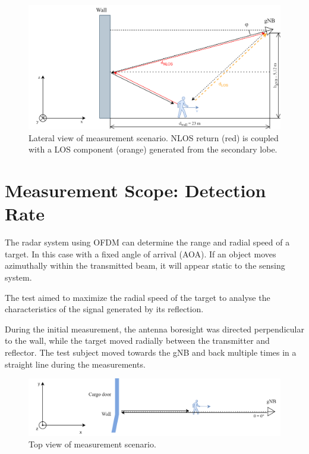 \begin{figure}[H]
	\centering
	\includegraphics[width=1\textwidth]{Images/Test1/base-lateral_view_los_geometry}
	\caption{Lateral view of measurement scenario. NLOS return (red) is coupled with a LOS component (orange) generated from the secondary lobe.}
	\label{fig:Test1_base-lateral_view}
\end{figure}

\section{Measurement Scope: Detection Rate}

The radar system using OFDM can determine the range and radial speed of a target. In this case with a fixed angle of arrival (AOA). If an object moves azimuthally within the transmitted beam, it will appear static to the sensing system.

The test aimed to maximize the radial speed of the target to analyse the characteristics of the signal generated by its reflection.

During the initial measurement, the antenna boresight was directed perpendicular to the wall, while the target moved radially between the transmitter and reflector. The test subject moved towards the gNB and back multiple times in a straight line during the measurements.

\begin{figure}[H]
	\centering
	\includegraphics[width=1\textwidth]{Images/Test1/base-top_view}
	\caption{Top view of measurement scenario.}
	\label{fig:Test1_base-top_view}
\end{figure}


